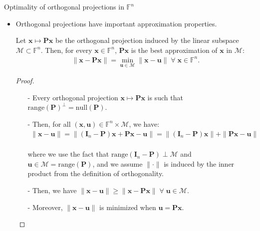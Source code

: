 \documentclass[t,usepdftitle=false]{beamer}
\begin{document}
\begin{frame}{Optimality of orthogonal projections in $\mathbb{F}^n$}
\begin{itemize}
\item Orthogonal projections have important approximation properties.
\vspace{-.058cm}
\begin{theorem}
Let $\mathbf{x}\mapsto\mathbf{P}\mathbf{x}$ be the orthogonal projection induced by the linear subspace $\mathcal{M}\subset\mathbb{F}^n$.
Then, for every $\mathbf{x} \in\mathbb{F}^n$, $\mathbf{P}\mathbf{x}$ is the best approximation of $\mathbf{x}$ in $\mathcal{M}$:\vspace{-.12cm}
\begin{align*}
\|\mathbf{x}-\mathbf{P}\mathbf{x}\|=\underset{\mathbf{u}\in\mathcal{M}}{\min}\|\mathbf{x}-\mathbf{u}\|
\;\forall\;\mathbf{x}\in\mathbb{F}^n.
\end{align*}
\end{theorem}
\vspace{-.1cm}
\begin{proof}
\begin{itemize}
\item[-] Every orthogonal projection $\mathbf{x}\mapsto\mathbf{P}\mathbf{x}$ is such that $\mathrm{range}(\mathbf{P})^\perp=\mathrm{null}(\mathbf{P})$.\vspace{-.12cm}
\item[-] Then, for all $(\mathbf{x},\mathbf{u})\in\mathbb{F}^n\times\mathcal{M}$, we have:\vspace{-.12cm}
\begin{align*}
\|\mathbf{x}-\mathbf{u}\|
=\|(\mathbf{I}_n-\mathbf{P})\mathbf{x}+\mathbf{P}\mathbf{x}-\mathbf{u}\|
=\|(\mathbf{I}_n-\mathbf{P})\mathbf{x}\|+\|\mathbf{P}\mathbf{x}-\mathbf{u}\|
\end{align*}
\vspace*{-.55cm}\\
where we use the fact that $\mathrm{range}(\mathbf{I}_n-\mathbf{P})\perp\mathcal{M}$ and $\mathbf{u}\in\mathcal{M}=\mathrm{range}(\mathbf{P})$,
and we assume $\|\cdot\|$ is induced by the inner product from the definition of orthogonality.\vspace{-.12cm}
\item[-] Then, we have $\|\mathbf{x}-\mathbf{u}\|\geq\|\mathbf{x}-\mathbf{P}\mathbf{x}\|\;\forall\;\mathbf{u}\in\mathcal{M}$.\vspace{-.12cm}
\item[-] Moreover, $\|\mathbf{x}-\mathbf{u}\|$ is minimized when $\mathbf{u}=\mathbf{P}\mathbf{x}$.\vspace{-.4cm}
\end{itemize}
\end{proof}
\end{itemize}
\end{frame}
\end{document}
